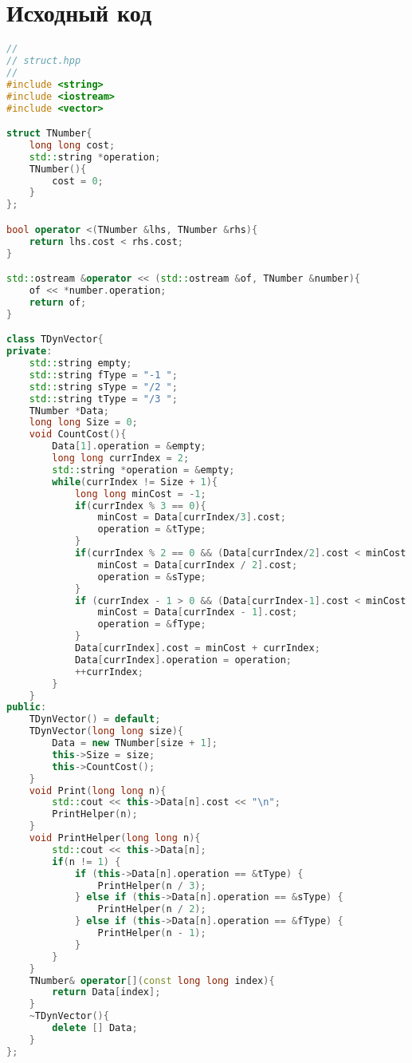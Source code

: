 \section{Исходный код}
\begin{lstlisting}[language=C++]
//
// struct.hpp
//
#include <string>
#include <iostream>
#include <vector>

struct TNumber{
    long long cost;
    std::string *operation;
    TNumber(){
        cost = 0;
    }
};

bool operator <(TNumber &lhs, TNumber &rhs){
    return lhs.cost < rhs.cost;
}

std::ostream &operator << (std::ostream &of, TNumber &number){
    of << *number.operation;
    return of;
}

class TDynVector{
private:
    std::string empty;
    std::string fType = "-1 ";
    std::string sType = "/2 ";
    std::string tType = "/3 ";
    TNumber *Data;
    long long Size = 0;
    void CountCost(){
        Data[1].operation = &empty;
        long long currIndex = 2;
        std::string *operation = &empty;
        while(currIndex != Size + 1){
            long long minCost = -1;
            if(currIndex % 3 == 0){
                minCost = Data[currIndex/3].cost;
                operation = &tType;
            }
            if(currIndex % 2 == 0 && (Data[currIndex/2].cost < minCost || minCost == -1)){
                minCost = Data[currIndex / 2].cost;
                operation = &sType;
            }
            if (currIndex - 1 > 0 && (Data[currIndex-1].cost < minCost || minCost == -1)){
                minCost = Data[currIndex - 1].cost;
                operation = &fType;
            }
            Data[currIndex].cost = minCost + currIndex;
            Data[currIndex].operation = operation;
            ++currIndex;
        }
    }
public:
    TDynVector() = default;
    TDynVector(long long size){
        Data = new TNumber[size + 1];
        this->Size = size;
        this->CountCost();
    }
    void Print(long long n){
        std::cout << this->Data[n].cost << "\n";
        PrintHelper(n);
    }
    void PrintHelper(long long n){
        std::cout << this->Data[n];
        if(n != 1) {
            if (this->Data[n].operation == &tType) {
                PrintHelper(n / 3);
            } else if (this->Data[n].operation == &sType) {
                PrintHelper(n / 2);
            } else if (this->Data[n].operation == &fType) {
                PrintHelper(n - 1);
            }
        }
    }
    TNumber& operator[](const long long index){
        return Data[index];
    }
    ~TDynVector(){
        delete [] Data;
    }
};
\end{lstlisting}

